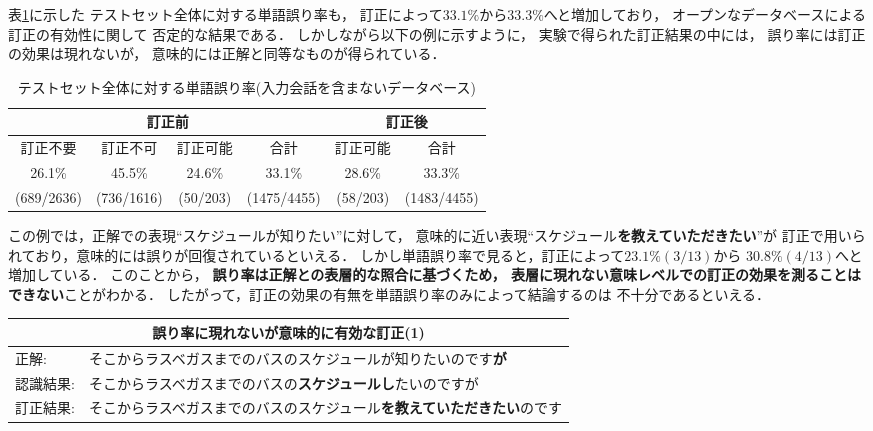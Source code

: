 表\ref{JE-db-open-dp-total}に示した
テストセット全体に対する単語誤り率も，
訂正によって$33.1\%$から$33.3\%$へと増加しており，
オープンなデータベースによる訂正の有効性に関して
否定的な結果である．
しかしながら以下の例に示すように，
実験で得られた訂正結果の中には，
誤り率には訂正の効果は現れないが，
意味的には正解と同等なものが得られている．

\begin{table}
\begin{center}
\caption{テストセット全体に対する単語誤り率(入力会話を含まないデータベース)}
\begin{tabular}{|c|c|c||c||c||c|} \hline
\multicolumn{4}{|c||}{訂正前} & \multicolumn{2}{c|}{訂正後} \\ \hline
訂正不要  & 訂正不可 & 訂正可能 & 合計 & 訂正可能 & 合計 \\ \hline\hline
26.1\% & 45.5\% & 24.6\% & 33.1\% & 28.6\% & 33.3\% \\
(689/2636) & (736/1616) & (50/203) & (1475/4455) & (58/203) & (1483/4455) \\ \hline
\end{tabular}
\label{JE-db-open-dp-total}
\end{center}
\end{table}

この例では，正解での表現``スケジュールが知りたい''に対して，
意味的に近い表現``スケジュール{\bf を教えていただきたい}''が
訂正で用いられており，意味的には誤りが回復されているといえる．
しかし単語誤り率で見ると，訂正によって$23.1\%(3/13)$から
$30.8\%(4/13)$へと増加している．
このことから，
{\bf 誤り率は正解との表層的な照合に基づくため，
表層に現れない意味レベルでの訂正の効果を測ることはできない}ことがわかる．
したがって，訂正の効果の有無を単語誤り率のみによって結論するのは
不十分であるといえる．

\begin{center}
\begin{tabular}{|ll|}
\multicolumn{2}{c}{誤り率に現れないが意味的に有効な訂正(1)}\\
\hline
正解: & そこからラスベガスまでのバスのスケジュールが知りたいのです{\bf が} \\
認識結果: & そこからラスベガスまでのバスの{\bf スケジュールし}たいのですが \\
訂正結果: & そこからラスベガスまでのバスのスケジュール{\bf を教えていただきたい}のです \\
\hline
\end{tabular}
\end{center}


